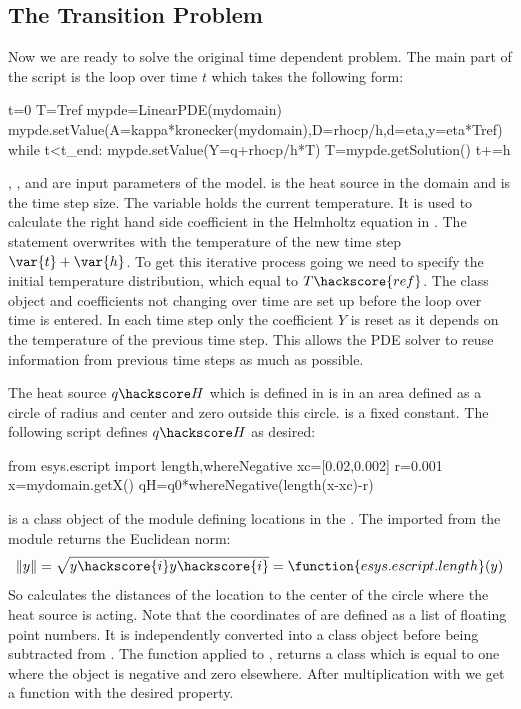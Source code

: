 \subsection{The Transition Problem}
\label{DIFFUSION TRANS SEC}
Now we are ready to solve the original time dependent problem. The main 
part of the script is the loop over time $t$ which takes the following form:
\begin{python}
t=0
T=Tref
mypde=LinearPDE(mydomain)
mypde.setValue(A=kappa*kronecker(mydomain),D=rhocp/h,d=eta,y=eta*Tref)
while t<t_end:
      mypde.setValue(Y=q+rhocp/h*T)
      T=mypde.getSolution()
      t+=h
\end{python}
, ,  and  are input parameters of the model.  is the heat source
in the domain and  is the time step size.
The variable 
holds the current temperature. It is used to calculate the right hand side coefficient  in the
Helmholtz equation in . The statement  overwrites  with the 
temperature of the new time step $\var{t}+\var{h}$. To get this iterative process going we need to specify the
initial temperature distribution, which equal to $T\hackscore{ref}$.
The \LinearPDE class object 
and coefficients not changing over time are set up before the loop over time is entered. In each time step only the coefficient
$Y$ is reset as it depends on the temperature of the previous time step. This allows the PDE solver to reuse information 
from previous time steps as much as possible.

The heat source $q\hackscore H$ which is defined in  is 
in an area defined as a circle of radius  and center  and zero outside this circle.
 is a fixed constant. The following script defines $q\hackscore H$ as desired:  
\begin{python}
from esys.escript import length,whereNegative
xc=[0.02,0.002]
r=0.001
x=mydomain.getX()
qH=q0*whereNegative(length(x-xc)-r)
\end{python}
 is a \Data class object of
the \escript module defining locations in the \Domain {}.
The  imported from the \escript module returns the 
Euclidean norm:
\begin{equation}\label{DIFFUSION HELM EQ 3aba}
\|y\|=\sqrt{
y\hackscore{i}
y\hackscore{i}
} = \function{esys.escript.length}(y)
\end{equation}
So  calculates the distances  
of the location  to the center of the circle  where the heat source is acting.
Note that the coordinates of  are defined as a list of floating point numbers. It is independently
converted into a \Data class object before being subtracted from . The function  
applied to
, returns a \Data class which is equal to one where the object is negative and
zero elsewhere. After multiplication with  we get a function with the desired property.

